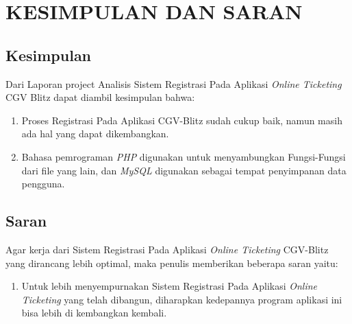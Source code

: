 \chapter{KESIMPULAN DAN SARAN }
\section{Kesimpulan }
\par
Dari Laporan project Analisis Sistem Registrasi Pada Aplikasi \textit{Online Ticketing} CGV Blitz  dapat diambil kesimpulan bahwa:
\begin{enumerate}
\item Proses Registrasi Pada Aplikasi CGV-Blitz sudah cukup baik, namun masih ada hal yang dapat dikembangkan.

\item Bahasa pemrograman \textit{PHP} digunakan untuk menyambungkan Fungsi-Fungsi dari file yang lain, dan \textit{MySQL} digunakan sebagai tempat penyimpanan data pengguna.

\end{enumerate}

\section{Saran }
\par
Agar kerja dari Sistem Registrasi Pada Aplikasi \textit{Online Ticketing} CGV-Blitz yang dirancang lebih optimal, maka penulis memberikan beberapa saran yaitu:
\begin{enumerate}
\item Untuk lebih menyempurnakan Sistem Registrasi Pada Aplikasi \textit{Online Ticketing} yang telah dibangun, diharapkan kedepannya program aplikasi ini bisa lebih di kembangkan kembali.

\end{enumerate}